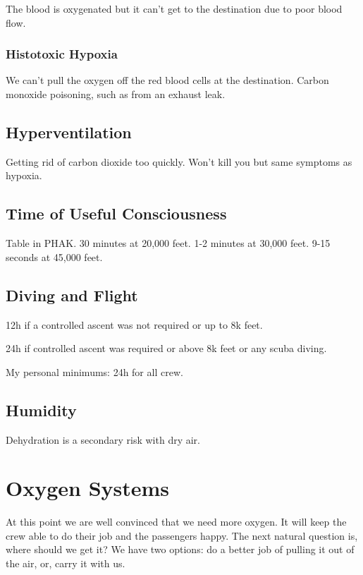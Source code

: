 The blood is oxygenated but it can't get to the destination due to poor blood flow.

\subsubsection{Histotoxic Hypoxia}

We can't pull the oxygen off the red blood cells at the destination. Carbon monoxide poisoning, such as from an exhaust leak.

\subsection{Hyperventilation}

Getting rid of carbon dioxide too quickly. Won't kill you but same symptoms as hypoxia.

\subsection{Time of Useful Consciousness}

Table in PHAK. 30 minutes at 20,000 feet. 1-2 minutes at 30,000 feet. 9-15 seconds at 45,000 feet.

\subsection{Diving and Flight}

12h if a controlled ascent was not required or up to 8k feet.

24h if controlled ascent was required or above 8k feet or any scuba diving.

My personal minimums: 24h for all crew.

\subsection{Humidity}

Dehydration is a secondary risk with dry air.

\section{Oxygen Systems}

At this point we are well convinced that we need more oxygen. It will keep the crew able to do their job and the passengers happy. The next natural question is, where should we get it? We have two options: do a better job of pulling it out of the air, or, carry it with us.

